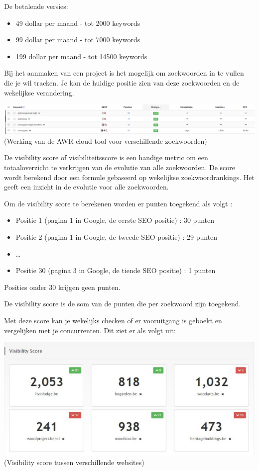 De betalende versies: 
\begin{itemize}
\item 49 dollar per maand - tot 2000 keywords
\item 99 dollar per maand - tot 7000 keywords
\item 199 dollar per maand - tot 14500 keywords
\end{itemize}

Bij het aanmaken van een project is het mogelijk om zoekwoorden in te vullen die je wil tracken. Je kan de huidige positie zien van deze zoekwoorden en de wekelijkse verandering. 

\includegraphics[width=\linewidth]{Bachelorproef/bachelor/img/awrcloud.PNG}
(Werking van de AWR cloud tool voor verschillende zoekwoorden)

De visibility score of visibiliteitsscore is een handige metric om een totaaloverzicht te verkrijgen van de evolutie van alle zoekwoorden. De score wordt berekend door een formule gebaseerd op wekelijkse zoekwoordrankings. Het geeft een inzicht in de evolutie voor alle zoekwoorden. 

Om de visibility score te berekenen worden er punten toegekend als volgt :
\begin{itemize}
\item Positie 1 (pagina 1 in Google, de eerste SEO positie) : 30 punten
\item Positie 2 (pagina 1 in Google, de tweede SEO positie) : 29 punten
\item …
\item Positie 30 (pagina 3 in Google, de tiende SEO positie) : 1 punten
\end{itemize}
Posities onder 30 krijgen geen punten.

De visibility score is de som van de punten die per zoekwoord zijn toegekend.

Met deze score kan je wekelijks checken of er vooruitgang is geboekt en vergelijken met je concurrenten. Dit ziet er als volgt uit: 

\includegraphics[width=\linewidth]{Bachelorproef/bachelor/img/awrcloudvisibility.PNG}
(Visibility score tussen verschillende websites)

